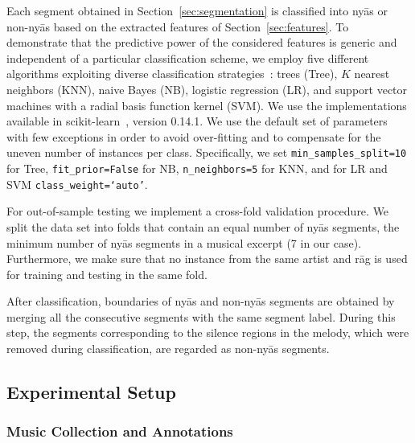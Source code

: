 {{Each segment obtained in Section~\ref{sec:segmentation} is classified into ny\={a}s or non-ny\={a}s based on the extracted features of Section~\ref{sec:features}. To demonstrate that the predictive power of the considered features is generic and independent of a particular classification scheme, we employ five different algorithms exploiting diverse classification strategies~\cite{Hastie09BOOK}: trees (Tree), $K$ nearest neighbors (KNN), naive Bayes (NB), logistic regression (LR), and support vector machines with a radial basis function kernel (SVM). We use the implementations available in scikit-learn~\cite{scikitlearn}, version 0.14.1. We use the default set of parameters with few exceptions in order to avoid over-fitting and to compensate for the uneven number of instances per class. Specifically, we set \texttt{min\_samples\_split=10} for Tree, \texttt{fit\_prior=False} for NB, \texttt{n\_neighbors=5} for KNN, and for LR and SVM \texttt{class\_weight=`auto'}.

For out-of-sample testing we implement a cross-fold validation procedure. We split the data set into folds that contain an equal number of ny\={a}s segments, the minimum number of ny\={a}s segments in a musical excerpt (7 in our case). Furthermore, we make sure that no instance from the same artist and r\={a}g is used for training and testing in the same fold.

After classification, boundaries of ny\={a}s and non-ny\={a}s segments are obtained by merging all the consecutive segments with the same segment label. During this step, the segments corresponding to the silence regions in the melody, which were removed during classification, are regarded as non-ny\={a}s segments.

\subsection{Experimental Setup}
\label{experimentalSetup}

\subsubsection{Music Collection and Annotations}

}}
